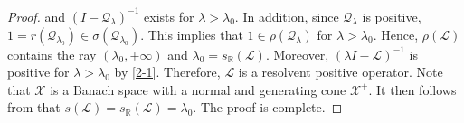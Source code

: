 \documentclass[11pt,reqno]{amsart}
\numberwithin{equation}{section}
\begin{document}
\begin{proof}
and
$(I - \mathcal{Q}_{\lambda} )^{-1}$ exists for $\lambda>\lambda_{0}$.
In addition, since $\mathcal{Q}_{\lambda}$ is positive, $1 = r(\mathcal{Q}_{\lambda_{0}}) \in \sigma (\mathcal{Q}_{\lambda_{0}})$.
This implies that $1 \in \rho(\mathcal{Q}_{\lambda})$ for $\lambda>\lambda_{0}$.
Hence, $\rho(\mathcal{L})$ contains the ray $(\lambda_{0},+\infty)$ and $\lambda_{0} = s_{\mathbb{R}}(\mathcal{L})$.
Moreover, $(\lambda I-\mathcal{L})^{-1}$ is positive for $\lambda>\lambda_{0}$ by \eqref{2-1}.
Therefore, $\mathcal{L}$ is a resolvent positive operator.
Note that $\mathcal{X}$ is a Banach space with a normal and generating cone $\mathcal{X}^{+}$.
It then follows from \cite[Theorem 3.5]{Th1} that $s(\mathcal{L})=s_{\mathbb{R}}(\mathcal{L})=\lambda_{0}$. The proof is complete.
\end{proof}
\end{document}
